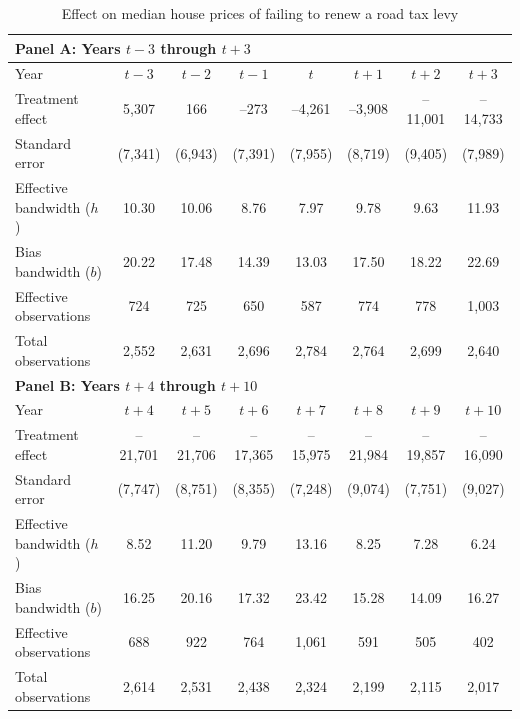 \begin{table}[H]
  \centering
  \caption{Effect on median house prices of failing to renew a road tax levy}
  \label{tab:median_sale_amount}
  \begin{threeparttable}
    \begin{tabular}{p{4.5cm}ccccccc}
    \toprule
    \multicolumn{8}{l}{\textbf{Panel A: Years $t-3$ through $t+3$}}\\
    \midrule
    Year       & $t\!-\!3$ & $t\!-\!2$ & $t\!-\!1$ & $t$ & $t\!+\!1$ & $t\!+\!2$ & $t\!+\!3$\\
    \midrule
    Treatment effect           &  5,307 &     166 &    –273 &  –4,261 &  –3,908 & –11,001 & –14,733 \\
    Standard error             & (7,341)& (6,943)& (7,391) & (7,955) & (8,719) & (9,405) & (7,989) \\
    Effective bandwidth ($h$)  & 10.30  & 10.06 &  8.76  &  7.97  &  9.78  &  9.63  & 11.93  \\
    Bias bandwidth ($b$)       & 20.22  & 17.48 & 14.39  & 13.03  & 17.50  & 18.22  & 22.69  \\
    Effective observations     &   724  &   725  &   650  &   587  &   774  &   778  & 1,003  \\
    Total observations         & 2,552  & 2,631  & 2,696  & 2,784  & 2,764  & 2,699  & 2,640  \\
    \midrule
    \multicolumn{8}{l}{\textbf{Panel B: Years $t+4$ through $t+10$}}\\
    \midrule
    Year       & $t\!+\!4$ & $t\!+\!5$ & $t\!+\!6$ & $t\!+\!7$ & $t\!+\!8$ & $t\!+\!9$ & $t\!+\!10$\\
    \midrule
    Treatment effect           & –21,701 & –21,706 & –17,365 & –15,975 & –21,984 & –19,857 & –16,090 \\
    Standard error             &  (7,747)&  (8,751)&  (8,355)&  (7,248)&  (9,074)&  (7,751)&  (9,027) \\
    Effective bandwidth ($h$)  &   8.52 &  11.20 &   9.79 &  13.16 &   8.25 &   7.28 &   6.24 \\
    Bias bandwidth ($b$)       &  16.25 &  20.16 &  17.32 &  23.42 &  15.28 &  14.09 &  16.27 \\
    Effective observations     &    688 &    922 &    764 &  1,061 &    591 &    505 &    402 \\
    Total observations         &  2,614 &  2,531 &  2,438 &  2,324 &  2,199 &  2,115 &  2,017 \\

\end{tabular}
\end{threeparttable}
\end{table}
